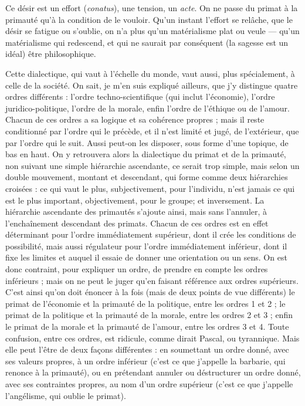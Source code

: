 Ce désir est un effort ({\it conatus}), une tension, un {\it acte}. On ne passe du primat
à la primauté qu’à la condition de le vouloir. Qu'un instant l'effort se relâche,
que le désir se fatigue ou s’oublie, on n’a plus qu’un matérialisme plat ou veule
— qu'un matérialisme qui redescend, et qui ne saurait par conséquent (la sagesse
est un idéal) être philosophique.

Cette dialectique, qui vaut à l’échelle du monde, vaut aussi, plus spécialement,
à celle de la société. On sait, je m’en suis expliqué ailleurs, que j’y distingue
quatre ordres différents : l’ordre techno-scientifique (qui inclut l’économie),
l’ordre juridico-politique, l’ordre de la morale, enfin l’ordre de
l'éthique ou de l'amour. Chacun de ces ordres a sa logique et sa cohérence
propres ; mais il reste conditionné par l’ordre qui le précède, et il n’est limité et
jugé, de l'extérieur, que par l’ordre qui le suit. Aussi peut-on les disposer, sous
forme d’une topique, de bas en haut. On y retrouvera alors la dialectique du
primat et de la primauté, non suivant une simple hiérarchie ascendante, ce
serait trop simple, mais selon un double mouvement, montant et descendant,
qui forme comme deux hiérarchies croisées : ce qui vaut le plus, subjectivement,
pour l'individu, n’est jamais ce qui est le plus important, objectivement,
pour le groupe; et inversement. La hiérarchie ascendante des primautés
s'ajoute ainsi, mais sans l’annuler, à l’enchaînement descendant des primats.
Chacun de ces ordres est en effet déterminant pour l’ordre immédiatement
supérieur, dont il crée les conditions de possibilité, mais aussi régulateur pour
l’ordre immédiatement inférieur, dont il fixe les limites et auquel il essaie de
donner une orientation ou un sens. On est donc contraint, pour expliquer un
ordre, de prendre en compte les ordres inférieurs ; mais on ne peut le juger
qu’en faisant référence aux ordres supérieurs. C’est ainsi qu’on doit énoncer à
la fois (mais de deux points de vue différents) le primat de l’économie et la primauté
de la politique, entre les ordres 1 et 2 ; le primat de la politique et la primauté
de la morale, entre les ordres 2 et 3 ; enfin le primat de la morale et la
primauté de l’amour, entre les ordres 3 et 4. Toute confusion, entre ces ordres,
est ridicule, comme dirait Pascal, ou tyrannique. Mais elle peut l’être de deux
façons différentes : en soumettant un ordre donné, avec ses valeurs propres, à
un ordre inférieur (c’est ce que j'appelle la barbarie, qui renonce à la primauté),
ou en prétendant annuler ou déstructurer un ordre donné, avec ses contraintes
propres, au nom d’un ordre supérieur (c’est ce que j'appelle l’angélisme, qui
oublie le primat).

